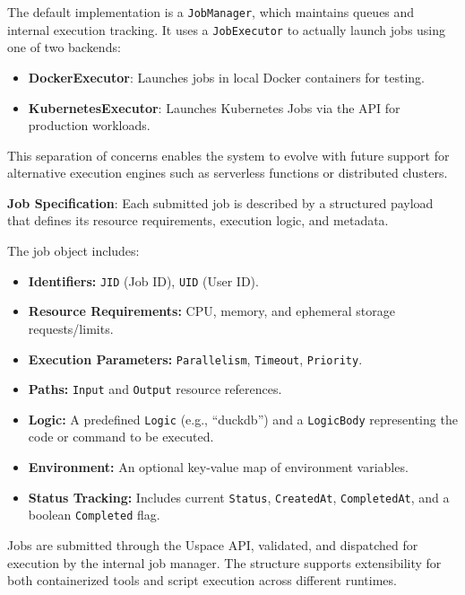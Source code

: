 The default implementation is a \texttt{JobManager}, which maintains queues and internal execution tracking. It uses a \texttt{JobExecutor} to actually launch jobs using one of two backends:
\begin{itemize}
    \item \textbf{DockerExecutor}: Launches jobs in local Docker containers for testing.
    \item \textbf{KubernetesExecutor}: Launches Kubernetes Jobs via the API for production workloads.
\end{itemize}

This separation of concerns enables the system to evolve with future support for alternative execution engines such as serverless functions or distributed clusters.

\textbf{Job Specification}: Each submitted job is described by a structured payload that defines its resource requirements, execution logic, and metadata.

The job object includes:

\begin{itemize}
    \item \textbf{Identifiers:} \texttt{JID} (Job ID), \texttt{UID} (User ID).
    \item \textbf{Resource Requirements:} CPU, memory, and ephemeral storage requests/limits.
    \item \textbf{Execution Parameters:} \texttt{Parallelism}, \texttt{Timeout}, \texttt{Priority}.
    \item \textbf{Paths:} \texttt{Input} and \texttt{Output} resource references.
    \item \textbf{Logic:} A predefined \texttt{Logic} (e.g., ``duckdb'') and a \texttt{LogicBody} representing the code or command to be executed.
    \item \textbf{Environment:} An optional key-value map of environment variables.
    \item \textbf{Status Tracking:} Includes current \texttt{Status}, \texttt{CreatedAt}, \texttt{CompletedAt}, and a boolean \texttt{Completed} flag.
\end{itemize}

Jobs are submitted through the Uspace API, validated, and dispatched for execution by the internal job manager. The structure supports extensibility for both containerized tools and script execution across different runtimes.

